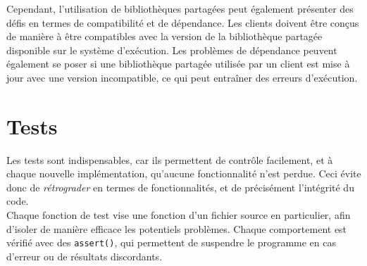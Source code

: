 Cependant, l'utilisation de bibliothèques partagées peut également présenter des défis en termes de compatibilité et de dépendance. Les clients doivent être conçus de manière à être compatibles avec la version de la bibliothèque partagée disponible sur le système d'exécution. Les problèmes de dépendance peuvent également se poser si une bibliothèque partagée utilisée par un client est mise à jour avec une version incompatible, ce qui peut entraîner des erreurs d'exécution.

\section{Tests}
\label{sec:tests}

Les tests sont indispensables, car ils permettent de contrôle facilement, et à chaque nouvelle implémentation, qu'aucune fonctionnalité n'est perdue. Ceci évite donc de \textit{rétrograder} en termes de fonctionnalités, et de précisément l'intégrité du code. \\
Chaque fonction de test vise une fonction d'un fichier source en particulier, afin d'isoler de manière efficace les potentiels problèmes. Chaque comportement est vérifié avec des \texttt{assert()}, qui permettent de suspendre le programme en cas d'erreur ou de résultats discordants.